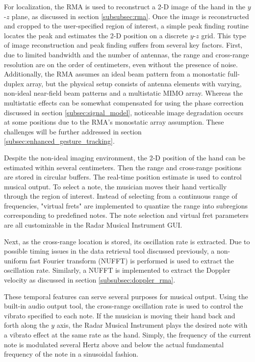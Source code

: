 \documentclass[10pt,journal,final]{IEEEtran}
\begin{document}
For localization, the RMA is used to reconstruct a 2-D image of the hand in the $y$-$z$ plane, as discussed in section \ref{subsubsec:rma}. Once the image is reconstructed and cropped to the user-specified region of interest, a simple peak finding routine locates the peak and estimates the 2-D position on a discrete $y$-$z$ grid. This type of image reconstruction and peak finding suffers from several key factors. First, due to limited bandwidth and the number of antennas, the range and cross-range resolution are on the order of centimeters, even without the presence of noise. Additionally, the RMA assumes an ideal beam pattern from a monostatic full-duplex array, but the physical setup consists of antenna elements with varying, non-ideal near-field beam patterns and a multistatic MIMO array. Whereas the multistatic effects can be somewhat compensated for using the phase correction discussed in section \ref{subsec:signal_model}, noticeable image degradation occurs at some positions due to the RMA's monostatic array assumption. These challenges will be further addressed in section \ref{subsec:enhanced_gesture_tracking}.

Despite the non-ideal imaging environment, the 2-D position of the hand can be estimated within several centimeters. Then the range and cross-range positions are stored in circular buffers. The real-time position estimate is used to control musical output. To select a note, the musician moves their hand vertically through the region of interest. Instead of selecting from a continuous range of frequencies, "virtual frets" are implemented to quantize the range into subregions corresponding to predefined notes. The note selection and virtual fret parameters are all customizable in the Radar Musical Instrument GUI.

Next, as the cross-range location is stored, its oscillation rate is extracted. Due to possible timing issues in the data retrieval tool discussed previously, a non-uniform fast Fourier transform (NUFFT) is performed is used to extract the oscillation rate. Similarly, a NUFFT is implemented to extract the Doppler velocity as discussed in section \ref{subsubsec:doppler_rma}. 

These temporal features can serve several purposes for musical output. Using the built-in audio output tool, the cross-range oscillation rate is used to control the vibrato specified to each note. If the musician is moving their hand back and forth along the $y$ axis, the Radar Musical Instrument plays the desired note with a vibrato effect at the same rate as the hand. Simply, the frequency of the current note is modulated several Hertz above and below the actual fundamental frequency of the note in a sinusoidal fashion.
\end{document}
